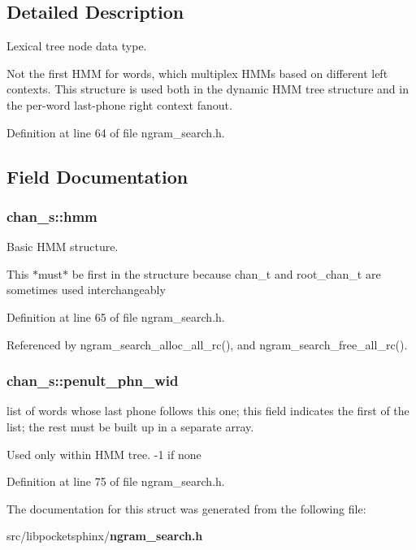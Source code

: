 \subsection{\-Detailed \-Description}
\-Lexical tree node data type. 

\-Not the first \-H\-M\-M for words, which multiplex \-H\-M\-Ms based on different left contexts. \-This structure is used both in the dynamic \-H\-M\-M tree structure and in the per-\/word last-\/phone right context fanout. 

\-Definition at line 64 of file ngram\-\_\-search.\-h.



\subsection{\-Field \-Documentation}
\subsubsection[{hmm}]{ {\bf chan\-\_\-s\-::hmm}}\label{structchan__s_a742d6a125ac468b95a1ddd880a956e35}


\-Basic \-H\-M\-M structure. 

\-This $\ast$must$\ast$ be first in the structure because chan\-\_\-t and root\-\_\-chan\-\_\-t are sometimes used interchangeably 

\-Definition at line 65 of file ngram\-\_\-search.\-h.



\-Referenced by ngram\-\_\-search\-\_\-alloc\-\_\-all\-\_\-rc(), and ngram\-\_\-search\-\_\-free\-\_\-all\-\_\-rc().

\subsubsection[{penult\-\_\-phn\-\_\-wid}]{ {\bf chan\-\_\-s\-::penult\-\_\-phn\-\_\-wid}}\label{structchan__s_a136796f6a13c0d6989120f9aa25b85f1}


list of words whose last phone follows this one; this field indicates the first of the list; the rest must be built up in a separate array. 

\-Used only within \-H\-M\-M tree. -\/1 if none 

\-Definition at line 75 of file ngram\-\_\-search.\-h.



\-The documentation for this struct was generated from the following file\-:\begin{DoxyCompactItemize}
\item 
src/libpocketsphinx/{\bf ngram\-\_\-search.\-h}\end{DoxyCompactItemize}
